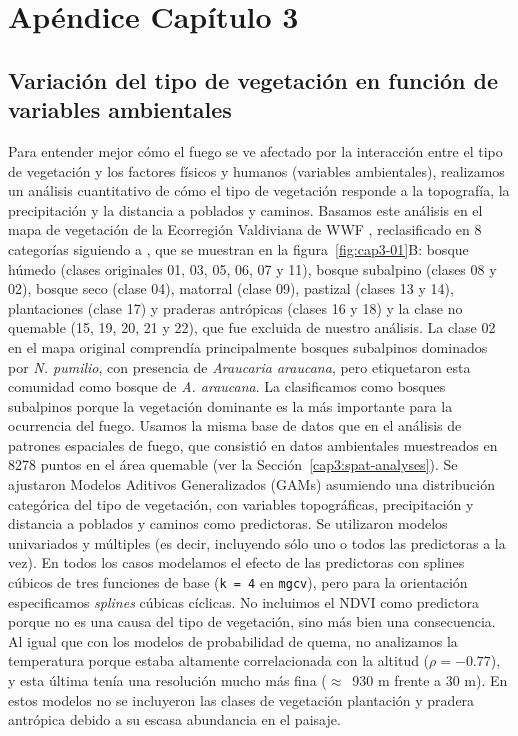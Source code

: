 \newpage{\ }
\cleardoublepage

\chapter{Apéndice Capítulo 3}\label{append_03}

\section{Variación del tipo de vegetación en función de variables ambientales}\label{append:veg}

Para entender mejor cómo el fuego se ve afectado por la interacción entre el tipo de vegetación y los factores físicos y humanos (variables ambientales), realizamos un análisis cuantitativo de cómo el tipo de vegetación responde a la topografía, la precipitación y la distancia a poblados y caminos. Basamos este análisis en el mapa de vegetación de la Ecorregión Valdiviana de WWF \citep{lara_vegetacion_1999}, reclasificado en 8 categorías siguiendo a \citet{kitzberger_projections_2022}, que se muestran en la figura~\ref{fig:cap3-01}B: bosque húmedo (clases originales 01, 03, 05, 06, 07 y 11), bosque subalpino (clases 08 y 02), bosque seco (clase 04), matorral (clase 09), pastizal (clases 13 y 14), plantaciones (clase 17) y praderas antrópicas (clases 16 y 18) y la clase no quemable (15, 19, 20, 21 y 22), que fue excluida de nuestro análisis. La clase 02 en el mapa original comprendía principalmente bosques subalpinos dominados por \textit{N. pumilio}, con presencia de \textit{Araucaria araucana}, pero \citet{lara_vegetacion_1999} etiquetaron esta comunidad como bosque de \textit{A. araucana}. La clasificamos como bosques subalpinos porque la vegetación dominante es la más importante para la ocurrencia del fuego. Usamos la misma base de datos que en el análisis de patrones espaciales de fuego, que consistió en datos ambientales muestreados en 8278 puntos en el área quemable (ver la Sección~\ref{cap3:spat-analyses}). Se ajustaron Modelos Aditivos Generalizados (GAMs) asumiendo una distribución categórica del tipo de vegetación, con variables topográficas, precipitación y distancia a poblados y caminos como predictoras. Se utilizaron modelos univariados y múltiples (es decir, incluyendo sólo uno o todos las predictoras a la vez). En todos los casos modelamos el efecto de las predictoras con splines cúbicos de tres funciones de base (\texttt{k = 4} en \texttt{mgcv}), pero para la orientación especificamos \textit{splines} cúbicas cíclicas. No incluimos el NDVI como predictora porque no es una causa del tipo de vegetación, sino más bien una consecuencia. Al igual que con los modelos de probabilidad de quema, no analizamos la temperatura porque estaba altamente correlacionada con la altitud ($\rho = - 0.77$), y esta última tenía una resolución mucho más fina ($\approx$~930 m frente a 30 m). En estos modelos no se incluyeron las clases de vegetación plantación y pradera antrópica debido a su escasa abundancia en el paisaje.

